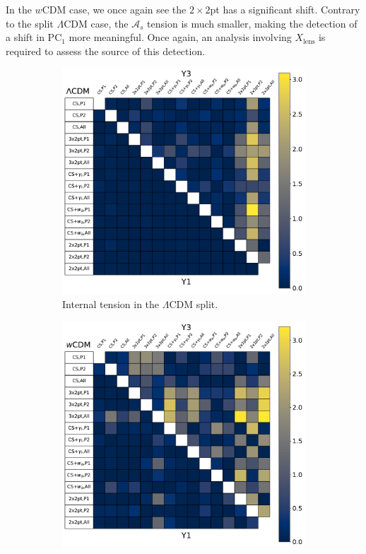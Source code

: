 In the $w$CDM case, we once again see the $2\times2$pt has a significant shift. Contrary to the split $\Lambda$CDM case, the $\mathcal{A}_s$ tension is much smaller, making the detection of a shift in $\mathrm{PC}_1$ more meaningful. Once again, an analysis involving $X_\mathrm{lens}$ is required to assess the source of this detection.
\begin{figure}[ht]
	\centering
	\begin{subfigure}[b]{0.45\textwidth}
		\includegraphics[width=\textwidth]{plots/internal_tension_v4.pdf}
		\caption{Internal tension in the $\Lambda$CDM split.}
		\label{fig:lcdm_tension}
	\end{subfigure}
	\begin{subfigure}[b]{0.45\textwidth}
		\includegraphics[width=\textwidth]{plots/internal_tension_wcdm.pdf}

\end{subfigure}
\end{figure}
